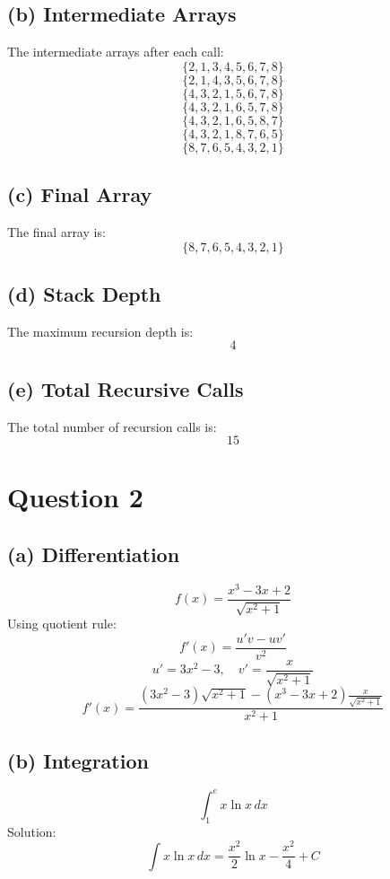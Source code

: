 \documentclass[11pt]{article}
\begin{document}
\subsection*{(b) Intermediate Arrays}
The intermediate arrays after each call:
\[ \{2, 1, 3, 4, 5, 6, 7, 8\} \]
\[ \{2, 1, 4, 3, 5, 6, 7, 8\} \]
\[ \{4, 3, 2, 1, 5, 6, 7, 8\} \]
\[ \{4, 3, 2, 1, 6, 5, 7, 8\} \]
\[ \{4, 3, 2, 1, 6, 5, 8, 7\} \]
\[ \{4, 3, 2, 1, 8, 7, 6, 5\} \]
\[ \{8, 7, 6, 5, 4, 3, 2, 1\} \]

\subsection*{(c) Final Array}
The final array is:
\[\{8, 7, 6, 5, 4, 3, 2, 1\}\]

\subsection*{(d) Stack Depth}
The maximum recursion depth is:
\[4\]

\subsection*{(e) Total Recursive Calls}
The total number of recursion calls is:
\[15\]

\newpage
\section*{Question 2}
\subsection*{(a) Differentiation}

\[f(x) = \frac{x^3 - 3x + 2}{\sqrt{x^2 + 1}}\]
Using quotient rule:
\[f'(x) = \frac{u'v - uv'}{v^2}\]
\[u' = 3x^2 - 3, \quad v' = \frac{x}{\sqrt{x^2 + 1}}\]
\[f'(x) = \frac{(3x^2 - 3)\sqrt{x^2 + 1} - (x^3 - 3x + 2)\frac{x}{\sqrt{x^2 + 1}}}{x^2 + 1}\]

\begin{center}
\end{center}

\subsection*{(b) Integration}

\[\int_1^e x \ln x \, dx\]
Solution:
\[\int x \ln x \, dx = \frac{x^2}{2} \ln x - \frac{x^2}{4} + C\]
\end{document}
